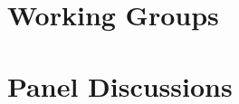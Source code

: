 \documentclass[a4paper,UKenglish]{dagrep}
\begin{document}
\section{Working Groups}












\section{Panel Discussions}




\end{document}
